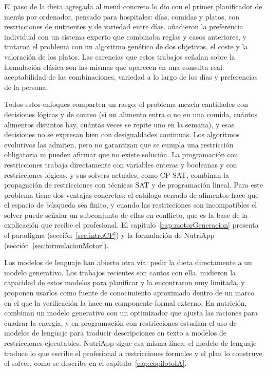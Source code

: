 El paso de la dieta agregada al menú concreto lo dio \citet{balintfy1964} con el primer planificador de menús por ordenador, pensado para hospitales: días, comidas y platos, con restricciones de nutrientes y de variedad entre días. \citet{petot1998} añadieron la preferencia individual con un sistema experto que combinaba reglas y casos anteriores, y \citet{kahraman2005} trataron el problema con un algoritmo genético de dos objetivos, el coste y la valoración de los platos. Las carencias que estos trabajos señalan sobre la formulación clásica son las mismas que aparecen en una consulta real: aceptabilidad de las combinaciones, variedad a lo largo de los días y preferencias de la persona.

Todos estos enfoques comparten un rasgo: el problema mezcla cantidades con decisiones lógicas y de conteo (si un alimento entra o no en una comida, cuántos alimentos distintos hay, cuántas veces se repite uno en la semana), y esas decisiones no se expresan bien con desigualdades continuas. Los algoritmos evolutivos las admiten, pero no garantizan que se cumpla una restricción obligatoria ni pueden afirmar que no existe solución. La programación con restricciones trabaja directamente con variables enteras y booleanas y con restricciones lógicas, y sus solvers actuales, como CP-SAT, combinan la propagación de restricciones con técnicas SAT y de programación lineal. Para este problema tiene dos ventajas concretas: el catálogo cerrado de alimentos hace que el espacio de búsqueda sea finito, y cuando las restricciones son incompatibles el solver puede señalar un subconjunto de ellas en conflicto, que es la base de la explicación que recibe el profesional. El capítulo~\ref{cap:motorGeneracion} presenta el paradigma (sección~\ref{sec:introCP}) y la formulación de NutriApp (sección~\ref{sec:formulacionMotor}).

Los modelos de lenguaje han abierto otra vía: pedir la dieta directamente a un modelo generativo. Los trabajos recientes son cautos con ella. \citet{valmeekam2023} midieron la capacidad de estos modelos para planificar y la encontraron muy limitada, y \citet{kambhampati2024} proponen usarlos como fuente de conocimiento aproximado dentro de un marco en el que la verificación la hace un componente formal externo. En nutrición, \citet{papastratis2024} combinan un modelo generativo con un optimizador que ajusta las raciones para cuadrar la energía, y en programación con restricciones \citet{michailidis2024} estudian el uso de modelos de lenguaje para traducir descripciones en texto a modelos de restricciones ejecutables. NutriApp sigue esa misma línea: el modelo de lenguaje traduce lo que escribe el profesional a restricciones formales y el plan lo construye el solver, como se describe en el capítulo~\ref{cap:copilotoIA}.

